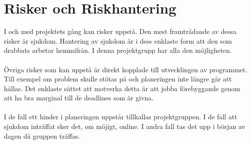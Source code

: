 \documentclass{TDP003mall}
\begin{document}
\section{Risker och Riskhantering}
I och med projektets gång kan risker uppstå. Den mest framträdande av dessa risker
är sjukdom. Hantering av sjukdom är i dess enklaste form att den som drabbats arbetar hemmifrån.
I denna projektgrupp har alla den möjligheten. \\\\
Övriga risker som kan uppstå är direkt kopplade till utvecklingen av programmet.
Till exempel om problem skulle stötas på och planeringen inte längre går att hållas.
Det enklaste sättet att motverka detta är att jobba förebyggande genom 
att ha bra marginal till de deadlines som är givna.\\\\
I de fall ett hinder i planeringen uppstår tillkallas projektgruppen. I de fall att
sjukdom inträffat sker det, om möjigt, online. I andra fall tas det upp i början av dagen
då gruppen träffas.
\end{document}
